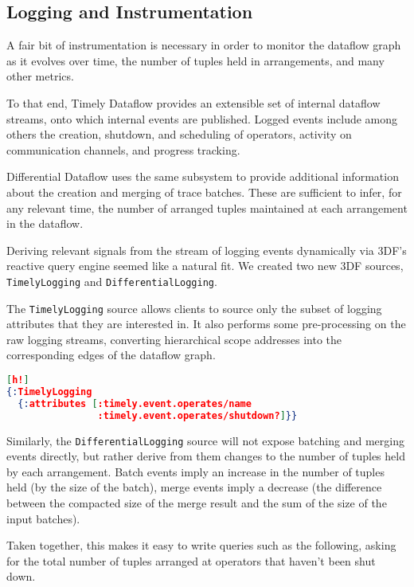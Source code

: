 \documentclass[../index.tex]{subfiles}
\begin{document}
\subsection{Logging and Instrumentation} \label{logging}

A fair bit of instrumentation is necessary in order to monitor the
dataflow graph as it evolves over time, the number of tuples held in
arrangements, and many other metrics.

To that end, Timely Dataflow provides an extensible set of internal
dataflow streams, onto which internal events are published. Logged
events include among others the creation, shutdown, and scheduling of
operators, activity on communication channels, and progress tracking.

Differential Dataflow uses the same subsystem to provide additional
information about the creation and merging of trace batches. These are
sufficient to infer, for any relevant time, the number of arranged
tuples maintained at each arrangement in the dataflow.

Deriving relevant signals from the stream of logging events
dynamically via 3DF's reactive query engine seemed like a natural
fit. We created two new 3DF sources, \texttt{TimelyLogging} and
\texttt{DifferentialLogging}.

The \texttt{TimelyLogging} source allows clients to source only the
subset of logging attributes that they are interested in. It also
performs some pre-processing on the raw logging streams, converting
hierarchical scope addresses into the corresponding edges of the
dataflow graph.

\begin{lstlisting}[language=json][h!]
{:TimelyLogging
  {:attributes [:timely.event.operates/name
                :timely.event.operates/shutdown?]}}
\end{lstlisting}

Similarly, the \texttt{DifferentialLogging} source will not expose
batching and merging events directly, but rather derive from them
changes to the number of tuples held by each arrangement. Batch events
imply an increase in the number of tuples held (by the size of the
batch), merge events imply a decrease (the difference between the
compacted size of the merge result and the sum of the size of the
input batches).

Taken together, this makes it easy to write queries such as the
following, asking for the total number of tuples arranged at operators
that haven't been shut down.
\end{document}
